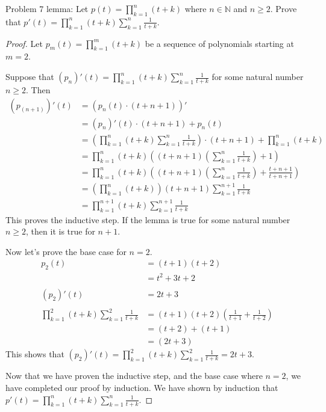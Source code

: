 \usepackage{amsthm}

Problem 7 lemma: Let $\displaystyle p(t) = \prod_{k=1}^{n} (t+k)$ where $n \in \mathbb{N}$ and $n \geq 2$. Prove that $\displaystyle p'(t) = \prod_{k=1}^{n} (t+k) \sum_{k=1}^{n} \frac{1}{t + k}$.

\begin{proof}
Let $\displaystyle p_{m}(t) = \prod_{k=1}^{m} (t+k)$ be a sequence of polynomials starting at $m = 2$. 

Suppose that $\displaystyle (p_{n})'(t) = \prod_{k=1}^{n} (t+k) \sum_{k=1}^{n} \frac{1}{t + k}$ for some natural number $n \geq 2$. Then
\begin{align*}
(p_{(n+1)})'(t) &= \left( p_{n}(t) \cdot (t + n + 1) \right)' \\
&= (p_{n})'(t) \cdot (t + n + 1) + p_{n}(t) \\
&= \left( \prod_{k=1}^{n} (t+k) \sum_{k=1}^{n} \frac{1}{t + k} \right) \cdot (t + n + 1) + \prod_{k=1}^{n} (t+k) \\
&= \prod_{k=1}^{n} (t+k) \left( (t + n + 1) \left( \sum_{k=1}^{n} \frac{1}{t + k} \right) + 1 \right) \\
&= \prod_{k=1}^{n} (t+k) \left( (t + n + 1) \left( \sum_{k=1}^{n} \frac{1}{t + k} \right) + \frac{t + n + 1}{t + n + 1} \right) \\
&= \left( \prod_{k=1}^{n} (t+k) \right) (t + n + 1) \sum_{k=1}^{n+1} \frac{1}{t + k} \\
&= \prod_{k=1}^{n+1} (t+k) \sum_{k=1}^{n+1} \frac{1}{t + k}
\end{align*}
This proves the inductive step. If the lemma is true for some natural number $n \geq 2$, then it is true for $n + 1$.

Now let's prove the base case for $n = 2$.
\begin{align*}
p_{2}(t) &= (t + 1)(t + 2) \\
&= t^2 + 3t + 2 \\ \\
(p_{2})'(t) &= 2t + 3 \\ \\
\prod_{k=1}^{2} (t+k) \sum_{k=1}^{2} \frac{1}{t + k} &= (t + 1)(t + 2)\left(\frac{1}{t + 1} + \frac{1}{t + 2}\right) \\
&= (t + 2) + (t + 1) \\
&= (2t + 3)
\end{align*}
This shows that $\displaystyle (p_{2})'(t) = \prod_{k=1}^{2} (t+k) \sum_{k=1}^{2} \frac{1}{t + k} = 2t + 3$.

Now that we have proven the inductive step, and the base case where $n = 2$, we have completed our proof by induction. We have shown by induction that $\displaystyle p'(t) = \prod_{k=1}^{n} (t+k) \sum_{k=1}^{n} \frac{1}{t + k}$.

\end{proof}
